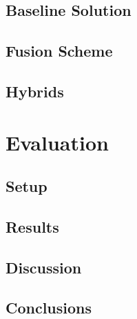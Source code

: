 \documentclass{lmproj}
\begin{document}
\section{Baseline Solution}
\label{kmeans}

\section{Fusion Scheme}
\label{kmeans}

\section{Hybrids}
\label{kmeans}



\chapter{Evaluation}
\label{evaluation}

\section{Setup}
\label{evaluation}

\section{Results}
\label{evaluation}

\section{Discussion}
\label{evaluation}


\section{Conclusions}
\label{conclusions}




\end{document}
